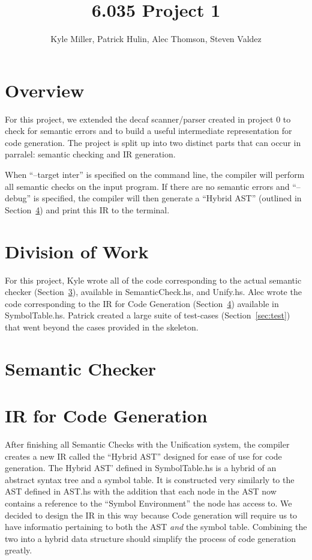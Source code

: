 \documentclass[11pt]{article}
\title{6.035 Project 1}
\author{Kyle Miller, Patrick Hulin, Alec Thomson, Steven Valdez}
\begin{document}
\maketitle

\section{Overview} 

For this project, we extended the decaf scanner/parser created in project 0 to check for semantic errors and to build a useful intermediate representation for code generation. The project is split up into two distinct parts that can occur in parralel: semantic checking and IR generation. 

When ``--target inter'' is specified on the command line, the compiler will perform all semantic checks on the input program. If there are no semantic errors and ``--debug'' is specified, the compiler will then generate a ``Hybrid AST'' (outlined in Section~\ref{sec:ir}) and print this IR to the terminal. 

\section{Division of Work} 

For this project, Kyle wrote all of the code corresponding to the actual semantic checker (Section~\ref{sec:checker}), available in SemanticCheck.hs, and Unify.hs. Alec wrote the code corresponding to the IR for Code Generation (Section~\ref{sec:ir}) available in SymbolTable.hs. Patrick created a large suite of test-cases (Section~\ref{sec:test}) that went beyond the cases provided in the skeleton. 

\section{Semantic Checker}
\label{sec:checker}

\section{IR for Code Generation}
\label{sec:ir}

After finishing all Semantic Checks with the Unification system, the compiler creates a new IR called the ``Hybrid AST'' designed for ease of use for code generation. The Hybrid AST' defined in SymbolTable.hs is a hybrid of an abstract syntax tree and a symbol table. It is constructed very similarly to the AST defined in AST.hs with the addition that each node in the AST now contains a reference to the ``Symbol Environment''  the node has access to. We decided to design the IR in this way because Code generation will require us to have informatio pertaining to both the AST \emph{and} the symbol table. Combining the two into a hybrid data structure should simplify the process of code generation greatly.
\end{document}
